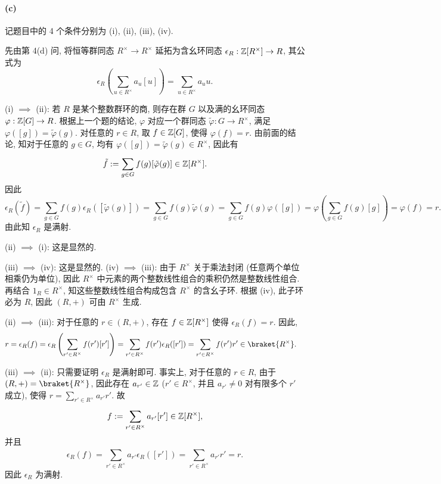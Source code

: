 \documentclass{article}
\begin{document}
\begin{solution}
	\paragraph{(c)} 记题目中的 4 个条件分别为 (i), (ii), (iii), (iv). 

	先由第 4(d) 问, 将恒等群同态 $R^\times \to R^\times$ 延拓为含幺环同态 $\epsilon_R: \mathbb{Z}[R^\times] \to R$, 其公式为
	\[ \epsilon_R\left(\sum_{u \in R^\times} a_u[u]\right) = \sum_{u \in R^\times} a_u u. \]

	(i) $\implies$ (ii): 若 $R$ 是某个整数群环的商, 则存在群 $G$ 以及满的幺环同态 $\varphi: \mathbb{Z}[G] \to R$. 根据上一个题的结论, $\varphi$ 对应一个群同态 $\tilde{\varphi}: G \to R^\times$, 满足 $\varphi([g]) = \tilde{\varphi}(g)$. 对任意的 $r \in R$, 取 $f \in \mathbb{Z}[G]$, 使得 $\varphi(f) = r$. 由前面的结论, 知对于任意的 $g \in G$, 均有 $\varphi([g]) = \tilde{\varphi}(g) \in R^\times$, 因此有
	\[ \tilde{f} := \sum_{g \in G}^{} f(g) [\tilde{\varphi}(g)] \in \mathbb{Z}[R^\times]. \]
	因此
	\[ \epsilon_R(\tilde{f}) 
	= \sum_{g \in G}^{} f(g) \epsilon_R([\tilde{\varphi}(g)]) 
	= \sum_{g \in G}^{} f(g) \tilde{\varphi}(g)
	= \sum_{g \in G}^{} f(g) \varphi([g])
	= \varphi\left( \sum_{g \in G}^{} f(g)[g] \right)
	= \varphi(f) = r. \]
	由此知 $\epsilon_R$ 是满射.

	(ii) $\implies$ (i): 这是显然的. 

	(iii) $\implies$ (iv): 这是显然的. (iv) $\implies$ (iii): 由于 $R^\times$ 关于乘法封闭 (任意两个单位相乘仍为单位), 因此 $R^\times$ 中元素的两个整数线性组合的乘积仍然是整数线性组合. 再结合 $1_R \in R^\times$, 知这些整数线性组合构成包含 $R^\times$ 的含幺子环. 根据 (iv), 此子环必为 $R$, 因此 $(R, +)$ 可由 $R^\times$ 生成.

	(ii) $\implies$ (iii): 对于任意的 $r \in (R, +)$, 存在 $f \in \mathbb{Z}[R^\times]$ 使得 $\epsilon_R(f) = r$. 因此, 
	\begin{align*}
		r &= \epsilon_R(f) 
		= \epsilon_R \left( \sum_{r' \in R^\times}^{} f(r')[r'] \right)
		= \sum_{r' \in R^\times}^{} f(r') \epsilon_R([r'])
		= \sum_{r' \in R^\times}^{} f(r') r' \in \braket{R^\times}.
	\end{align*}

	(iii) $\implies$ (ii): 只需要证明 $\epsilon_R$ 是满射即可. 事实上, 对于任意的 $r \in R$, 由于 $(R, +) = \braket{R^\times}$, 因此存在 $a_{r'} \in \mathbb{Z}$ ($r' \in R^\times$, 并且 $a_{r'} \neq 0$ 对有限多个 $r'$ 成立), 使得 $r = \sum_{r' \in R^\times}^{} a_{r'}r'$. 故
	\[ f := \sum_{r' \in R^\times}^{} a_{r'}[r'] \in \mathbb{Z}[R^\times], \]
	并且
	\[ \epsilon_R(f) = \sum_{r' \in R^\times}^{} a_{r'} \epsilon_R([r']) = \sum_{r' \in R^\times}^{} a_{r'} r' = r. \]
	因此 $\epsilon_R$ 为满射.
\end{solution}
\end{document}
